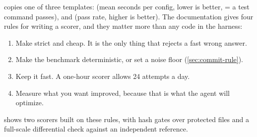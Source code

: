  copies one of three templates:  (mean seconds per config, lower is
better,  = a test command passes),  and  (pass rate, higher is
better). The documentation gives four rules for writing a scorer, and they matter more than any
code in the harness:
\begin{enumerate}[leftmargin=*,itemsep=1pt]
  \item Make  strict and cheap. It is the only thing that rejects a fast wrong answer.
  \item Make the benchmark deterministic, or set a noise floor (\cref{sec:commit-rule}).
  \item Keep it fast. A one-hour scorer allows 24 attempts a day.
  \item Measure what you want improved, because that is what the agent will optimize.
\end{enumerate}
 shows two scorers built on these rules, with hash gates over protected files
and a full-scale differential check against an independent reference.
